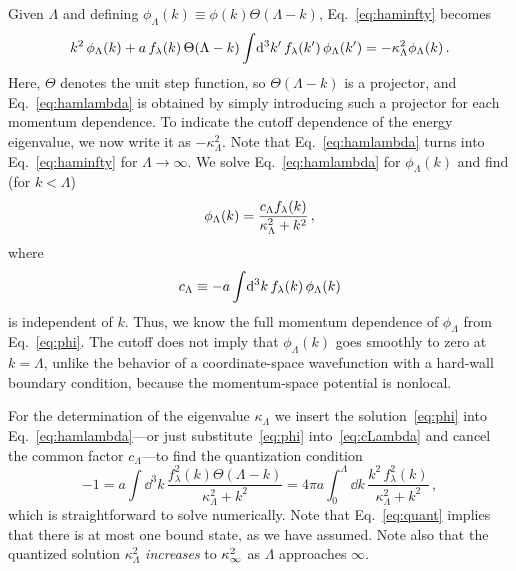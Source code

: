 	Given $\Lambda$ and defining $\phi_\Lambda(k) \equiv
	\phi(k)\Theta(\Lambda-k)$, Eq.~\eqref{eq:haminfty} becomes
	\begin{equation}
	 k^2\,\phi_\Lambda(k)
	 + a \,f_{\lambda}(k)\,\Theta(\Lambda-k) \int\!\mathrm{d}^3k'\,
	 f_{\lambda}(k')\,\phi_\Lambda(k')
	 = -\kappa_\Lambda^2 \phi_\Lambda(k) \,.
	\label{eq:hamlambda}
  \end{equation}
	Here, $\Theta$ denotes the unit step function, so $\Theta(\Lambda-k)$ is a
	projector, and Eq.~\eqref{eq:hamlambda} is obtained by simply introducing
	such
	a projector for each momentum dependence.  To indicate the cutoff dependence
	of the energy eigenvalue, we now write it as $-\kappa_\Lambda^2$.  Note that
	Eq.~\eqref{eq:hamlambda} turns into Eq.~\eqref{eq:haminfty} for
	$\Lambda\to\infty$.  We solve Eq.~\eqref{eq:hamlambda} for $\phi_\Lambda(k)$
	and find (for $k < \Lambda$)
	\begin{equation}
	\phi_\Lambda(k) = \frac{c_\Lambda f_{\lambda}(k)}{\kappa^2_\Lambda +k^2} \,,
	\label{eq:phi}
	\end{equation}
	where
	\begin{equation}
	c_\Lambda \equiv -a \int\! \mathrm{d}^3k\, f_{\lambda}(k)\,\phi_\Lambda(k)
	\label{eq:cLambda}
	\end{equation}
	is independent of $k$.  Thus, we know the full momentum dependence of
	$\phi_\Lambda$ from Eq.~\eqref{eq:phi}.  The cutoff does not imply
	that $\phi_\Lambda(k)$ goes smoothly to zero at $k=\Lambda$, unlike
	the behavior of a coordinate-space wavefunction with a hard-wall
	boundary condition, because the momentum-space potential is nonlocal.

	For the determination of the eigenvalue $\kappa_\Lambda$ we insert the
	solution~\eqref{eq:phi} into Eq.~\eqref{eq:hamlambda}---or just
	substitute~\eqref{eq:phi} into~\eqref{eq:cLambda} and cancel the common
	factor $c_\Lambda$---to find the quantization condition
	\begin{equation}
	 {-}1 = a \int\! \dd^3k\,
	 \frac{f^2_\lambda(k)\Theta(\Lambda-k)}{\kappa^2_\Lambda+k^2}
	 = 4\pi a \int_0^\Lambda\!\dd k\,
	 \frac{k^2\,f^2_\lambda(k)}{\kappa^2_\Lambda+k^2}
	 \,,
	\label{eq:quant}
	\end{equation}
	which is straightforward to solve numerically.  Note that
	Eq.~\eqref{eq:quant} implies that there is at most one bound state,
	as we have assumed.  Note also that the quantized solution
	$\kappa^2_\Lambda$ \emph{increases} to $\kappa_{\infty}^2$ as $\Lambda$
	approaches $\infty$.


